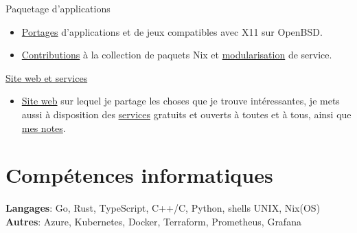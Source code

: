 \documentclass[margin,line]{../res}
\begin{document}
\begin{resume}

	Paquetage d'applications
	\begin{itemize}
		\item \href{https://github.com/theobori/openbsd-ports}{Portages} d'applications et de jeux compatibles avec X11 sur OpenBSD.
		\item \href{https://repology.org/maintainer/theo1.bori@epitech.eu}{Contributions} à la collection de paquets Nix et \href{https://github.com/theobori/nix-teeworlds}{modularisation} de service.
	\end{itemize}

	\href{https://github.com/theobori-cafe}{Site web et services}
	\begin{itemize}
		\item \href{https://theobori.cafe}{Site web} sur lequel je partage les choses que je trouve intéressantes, je mets aussi à disposition des \href{https://services.theobori.cafe}{services} gratuits et ouverts à toutes et à tous, ainsi que \href{https://zettel.theobori.cafe}{mes notes}.
	\end{itemize}

	\section{\sc Compétences informatiques}
	\textbf{Langages}: Go, Rust, TypeScript, C++/C, Python, shells UNIX, Nix(OS)\\
	\textbf{Autres}: Azure, Kubernetes, Docker, Terraform, Prometheus, Grafana

\end{resume}
\end{document}

